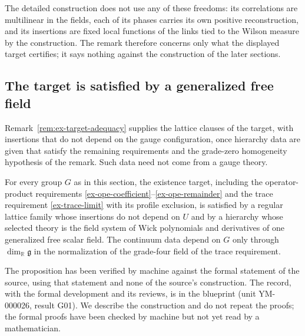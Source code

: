 \begin{remark}
The detailed construction does not use any of these freedoms: its
correlations are multilinear in the fields, each of its phases carries its
own positive reconstruction, and its insertions are fixed local functions of
the links tied to the Wilson measure by the construction. The remark
therefore concerns only what the displayed target certifies; it says nothing
against the construction of the later sections.
\end{remark}

\subsection{The target is satisfied by a generalized free field}
\label{ex-target-free-witness}

Remark~\ref{rem:ex-target-adequacy} supplies the lattice clauses of the
target, with insertions that do not depend on the gauge configuration, once
hierarchy data are given that satisfy the remaining requirements and the
grade-zero homogeneity hypothesis of the remark. Such data need not come from
a gauge theory.

\begin{proposition}
\label{prop:ex-target-free-witness}
For every group \(G\) as in this section, the existence target, including the
operator-product requirements
\eqref{ex-ope-coefficient}--\eqref{ex-ope-remainder} and the trace
requirement \eqref{ex-trace-limit} with its profile exclusion, is satisfied by
a regular lattice family whose insertions do not depend on \(U\) and by a
hierarchy whose selected theory is the field system of Wick polynomials and
derivatives of one generalized free scalar field. The continuum data depend
on \(G\) only through \(\dim_{\mathbb R}\mathfrak g\) in the normalization of
the grade-four field of the trace requirement.
\end{proposition}

The proposition has been verified by machine against the formal statement of
the source, using that statement and none of the source's construction. The
record, with the formal development and its reviews, is in the blueprint
(unit YM-000026, result G01). We describe the construction and do not repeat
the proofs; the formal proofs have been checked by machine but not yet read
by a mathematician.

